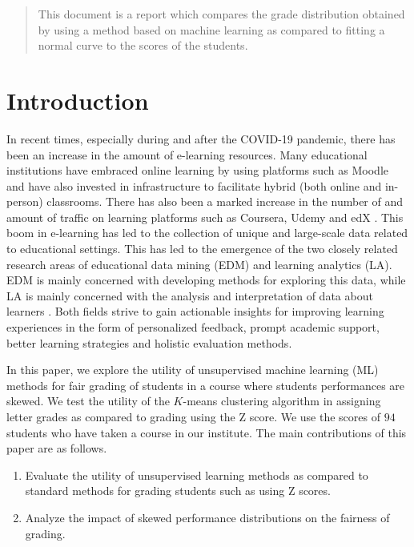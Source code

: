\documentclass[conference]{IEEEtran}
\begin{document}
\begin{abstract}
    This document is a report which compares the grade distribution obtained by
    using a method based on machine learning as compared to fitting a normal 
    curve to the scores of the students.
\end{abstract}

\section{Introduction}
\label{sec:intro}
In recent times, especially during and after the COVID-19 pandemic, there has
been an increase in the amount of e-learning resources. Many educational
institutions have embraced online learning by using platforms such as Moodle and
have also invested in infrastructure to facilitate hybrid (both online and
in-person) classrooms. There has also been a marked increase in the number of
and amount of traffic on learning platforms such as Coursera, Udemy and edX
\cite{royEmergingTrendsApplications2017}. This boom in e-learning has led to the
collection of unique and large-scale data related to educational settings. This
has led to the emergence of the two closely related research areas of
educational data mining (EDM) and learning analytics (LA). EDM is mainly
concerned with developing methods for exploring this data, while LA is mainly
concerned with the analysis and interpretation of data about learners
\cite{romeroEducationalDataMining2020}. Both fields strive to gain actionable
insights for improving learning experiences in the form of personalized
feedback, prompt academic support, better learning strategies and holistic
evaluation methods.

In this paper, we explore the utility of unsupervised machine learning (ML)
methods for fair grading of students in a course where students performances are
skewed. We test the utility of the $K$-means clustering algorithm in assigning
letter grades as compared to grading using the Z score. We use the scores of
$94$ students who have taken a course in our institute. The main contributions
of this paper are as follows.

\begin{enumerate}
    \item Evaluate the utility of unsupervised learning methods as compared to
    standard methods for grading students such as using Z scores.
    \item Analyze the impact of skewed performance distributions on the fairness
    of grading.
\end{enumerate}
\end{document}
